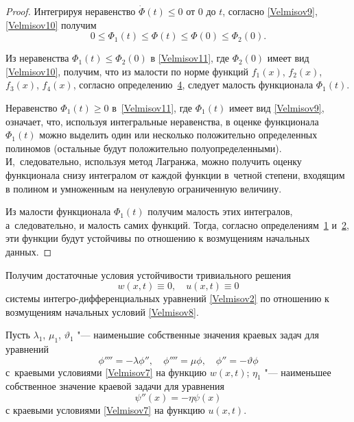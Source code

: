 \begin{proof}
Интегрируя неравенство $\dot{\Phi }(t)\le 0$ от 0 до $t$, согласно \eqref{Velmisov9}, \eqref{Velmisov10} получим
\begin{equation} \label{Velmisov11} 
0\le \Phi _{1} (t)\le \Phi (t)\le \Phi (0)\le \Phi _{2} (0). 
\end{equation} 

Из неравенства $\Phi _{1} (t)\le \Phi _{2} (0)$ в \eqref{Velmisov11}, где $\Phi _{2} (0)$ имеет вид \eqref{Velmisov10}, получим, что из малости по норме функций $f_{1} (x)$, $f_{2}(x)$, $f_{3}(x)$, $f_{4}(x)$, согласно определению~\hyperlink{Velm:def4}{4}, следует малость функционала $\Phi _{1} (t)$. 

Неравенство $\Phi _{1} (t)\ge 0$ в~\eqref{Velmisov11}, где $\Phi _{1} (t)$ имеет вид \eqref{Velmisov9}, означает, что, используя интегральные неравенства, в оценке функционала $\Phi _{1} (t)$ можно выделить один или несколько положительно определенных полиномов (остальные будут положительно полуопределенными). 
И,~следовательно, используя метод Лагранжа, можно получить оценку функционала снизу интегралом от каждой функции в~четной степени, входящим в полином и умноженным на ненулевую ограниченную величину. 

Из малости функционала $\Phi _{1} (t)$ получим малость этих интегралов, а~следовательно, и малость самих функций. Тогда, согласно определениям~\hyperlink{Velm:def1}{1}  и~\hyperlink{Velm:def2}{2}, эти функции будут устойчивы по отношению к возмущениям начальных данных. \end{proof}

\smallskip

Получим достаточные условия устойчивости тривиального решения 
$$w(x,t)\equiv 0,\quad u(x,t)\equiv 0$$ 
системы интегро-дифференциальных уравнений \eqref{Velmisov2} по отношению к возмущениям начальных условий \eqref{Velmisov8}. 

Пусть $\lambda _{1}$, $\mu_1$, $\vartheta_1$ "--- наименьшие собственные значения  \cite{Koll} краевых задач для уравнений 
\begin{equation}
\phi''''=-\lambda\phi'', \quad \phi''''=\mu \phi ,\quad \phi ''=-\vartheta \phi 
\label{Velm:Equations}
\end{equation}
с~краевыми условиями \eqref{Velmisov7} на функцию $w(x,t)$; 
$\eta _{1}$ "--- наименьшее собственное значение краевой задачи для уравнения 
\begin{equation}
\psi ''(x)=-\eta \psi (x)
\label{Velm:Equation}
\end{equation}
с краевыми условиями \eqref{Velmisov7} на функцию $u(x,t).$  

